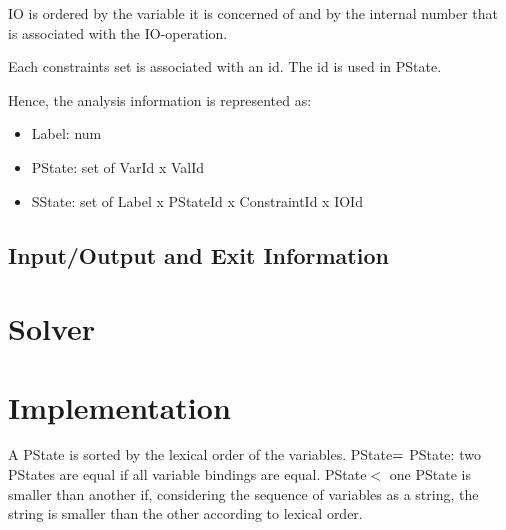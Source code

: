 IO is ordered by the variable it is concerned of and by the internal number that is associated with the IO-operation.

Each constraints set is associated with an id. The id is used in PState.

Hence, the analysis information is represented as:

\begin{itemize}
\item Label: num
\item PState: set of VarId x ValId
\item SState: set of Label x PStateId x ConstraintId x IOId
\end{itemize}

\subsection{Input/Output and Exit Information}

\section{Solver}


\section{Implementation}


A PState is sorted by the lexical order of the variables.
PState$=$ PState: two PStates are equal if all variable bindings are equal.
PState$<$ one PState is smaller than another if, considering the sequence of variables as a string, the string is smaller than the other according to lexical order.
